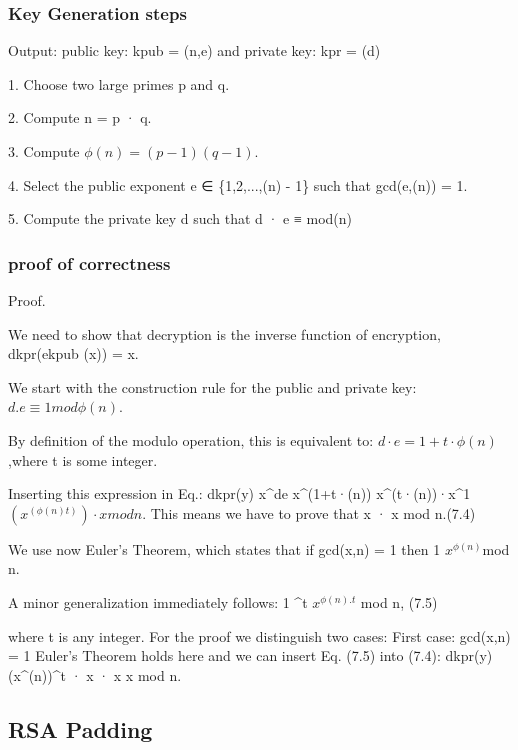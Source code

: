 \documentclass{article}
\begin{document}
\subsubsection{Key Generation steps}

 Output: public key: kpub = (n,e) and private key: kpr = (d)

1. Choose two large primes p and q.

2. Compute n = p · q.

3. Compute \(\phi(n)= (p - 1)(q-1)\).

4. Select the public exponent e ∈ \{1,2,...,\phi(n) - 1\} such that gcd(e,\phi(n)) = 1.

5. Compute the private key d such that d · e ≡ mod\phi(n)

\subsubsection{proof of correctness}

Proof.


We need to show that decryption is the inverse function of encryption,
dkpr(ekpub (x)) = x.


We start with the construction rule for the public and private
key: \(d.e \equiv 1 mod \phi(n)\).

By definition of the modulo operation, this is equivalent to:
\(d·e = 1+t ·\phi(n)\),where t is some integer.

Inserting this expression in Eq.:
dkpr(y) \equiv x^{de} \equiv x^{(1+t·\phi(n))} \equiv x^{(t·\phi(n))}·x^1 \equiv \((x^{(\phi(n)t)})·x mod n\).
This means we have to prove that x  · x mod n.(7.4)


We use now Euler’s Theorem, which states that if gcd(x,n) = 1 then 1 \equiv \(x^{\phi(n)}\)mod n.

A minor generalization immediately follows:
1 ^t \equiv \(x^{\phi(n).t}\) mod n, (7.5)

where t is any integer. For the proof we distinguish two cases:
First case: gcd(x,n) = 1
Euler’s Theorem holds here and we can insert Eq. (7.5) into (7.4):
dkpr(y) \equiv (x^{\phi(n)})^t · x  · x \equiv x mod n. 

\subsection{RSA Padding}
\end{document}
